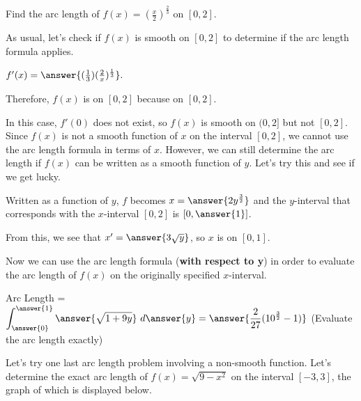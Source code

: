 \documentclass[handout,nooutcomes]{ximera}
\begin{document}

\begin{problem}
Find the arc length of $f(x) = \left(\frac{x}{2}\right)^{\frac{2}{3}}$ on $[0,2]$.  

As usual, let's check if $f(x)$ is smooth on $[0,2]$ to determine if the arc length formula applies.

$f'(x) = \answer{(\frac{1}{3})(\frac{2}{x})^{\frac{1}{3}}}.$ 

Therefore, $f(x)$ is  on $[0,2]$ because  on $[0,2]$.  

\begin{problem}
In this case, $f'(0)$ does not exist, so $f(x)$ is smooth on $(0,2]$ but not $[0,2]$.  Since $f(x)$ is not a smooth function of $x$ on the interval $[0,2]$, we cannot use the arc length formula in terms of $x$.  However, we can still determine the arc length if $f(x)$ can be written as a smooth function of $y$.  Let's try this and see if we get lucky.  

Written as a function of $y$, $f$ becomes $x = \answer{2y^{\frac{3}{2}}}$ and the $y$-interval that corresponds with the $x$-interval $[0,2]$ is $[0, \answer{1}]$.  

\begin{problem}
From this, we see that $x' = \answer{3\sqrt{y}}$, so $x$ is  on $[0,1]$.  

\begin{problem}
Now we can use the arc length formula (\textbf{with respect to y}) in order to evaluate the arc length of $f(x)$ on the originally specified $x$-interval. 

Arc Length = $\displaystyle\int_{\answer{0}}^{\answer{1}} \answer{\sqrt{1+9y}} \ d\answer{y} = \answer{\frac{2}{27}(10^{\frac{3}{2}}-1)}$ (Evaluate the arc length exactly)

\end{problem}
\end{problem}
\end{problem}
\end{problem}


Let's try one last arc length problem involving a non-smooth function.  Let's determine the exact arc length of $f(x) = \sqrt{9-x^2}$ on the interval $[-3,3]$, the graph of which is displayed below.
\end{document}
